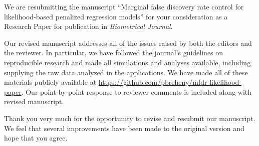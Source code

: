 \documentclass{uiletter}
\begin{document}

We are resubmitting the manuscript ``Marginal false discovery rate control for likelihood-based penalized regression models'' for your consideration as a Research Paper for publication in {\em Biometrical Journal}.

Our revised manuscript addresses all of the issues raised by both the editors and the reviewer.  In particular, we have followed the journal's guidelines on reproducible research and made all simulations and analyses available, including supplying the raw data analyzed in the applications.  We have made all of these materials publicly available at \url{https://github.com/pbreheny/mfdr-likelihood-paper}.
Our point-by-point response to reviewer comments is included along with revised manuscript.

Thank you very much for the opportunity to revise and resubmit our manuscript.  We feel that several improvements have been made to the original version and hope that you agree.

\EndLetter
\end{document}
